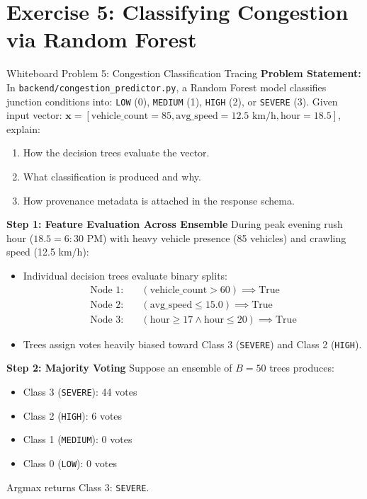 \section{Exercise 5: Classifying Congestion via Random Forest}
\label{sec:wb_congestion}

\begin{interviewq}{Whiteboard Problem 5: Congestion Classification Tracing}
\textbf{Problem Statement:}
In \texttt{backend/congestion\_predictor.py}, a Random Forest model classifies junction conditions into:
\texttt{LOW} (0), \texttt{MEDIUM} (1), \texttt{HIGH} (2), or \texttt{SEVERE} (3).
Given input vector: $\mathbf{x} = [\text{vehicle\_count} = 85, \text{avg\_speed} = 12.5 \text{ km/h}, \text{hour} = 18.5]$, explain:
\begin{enumerate}
    \item How the decision trees evaluate the vector.
    \item What classification is produced and why.
    \item How provenance metadata is attached in the response schema.
\end{enumerate}
\tcblower
\textbf{Step 1: Feature Evaluation Across Ensemble}
During peak evening rush hour ($18.5 = 6:30$ PM) with heavy vehicle presence (85 vehicles) and crawling speed (12.5 km/h):
\begin{itemize}
    \item Individual decision trees evaluate binary splits:
    \begin{align*}
    \text{Node 1:} &\quad (\text{vehicle\_count} > 60) \implies \text{True} \\
    \text{Node 2:} &\quad (\text{avg\_speed} \le 15.0) \implies \text{True} \\
    \text{Node 3:} &\quad (\text{hour} \ge 17 \land \text{hour} \le 20) \implies \text{True}
    \end{align*}
    \item Trees assign votes heavily biased toward Class 3 (\texttt{SEVERE}) and Class 2 (\texttt{HIGH}).
\end{itemize}

\textbf{Step 2: Majority Voting}
Suppose an ensemble of $B = 50$ trees produces:
\begin{itemize}
    \item Class 3 (\texttt{SEVERE}): 44 votes
    \item Class 2 (\texttt{HIGH}): 6 votes
    \item Class 1 (\texttt{MEDIUM}): 0 votes
    \item Class 0 (\texttt{LOW}): 0 votes
\end{itemize}
Argmax returns Class 3: \texttt{SEVERE}.


\end{interviewq}
